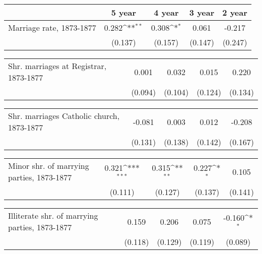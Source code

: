 {
\def\sym#1{\ifmmode^{#1}\else\(^{#1}\)\fi}
\begin{tabular}{l*{4}{c}}
\hline\hline
                    &\multicolumn{1}{c}{5 year}&\multicolumn{1}{c}{4 year}&\multicolumn{1}{c}{3 year}&\multicolumn{1}{c}{2 year}\\
\hline
Marriage rate, 1873-1877&       0.282\sym{**} &       0.308\sym{*}  &       0.061         &      -0.217         \\
                    &     (0.137)         &     (0.157)         &     (0.147)         &     (0.247)         \\
\hline\hline
\end{tabular}
}
{
\def\sym#1{\ifmmode^{#1}\else\(^{#1}\)\fi}
\begin{tabular}{l*{4}{c}}
\hline\hline
\hline
Shr. marriages at Registrar, 1873-1877&       0.001         &       0.032         &       0.015         &       0.220         \\
                    &     (0.094)         &     (0.104)         &     (0.124)         &     (0.134)         \\
\hline\hline
\end{tabular}
}
{
\def\sym#1{\ifmmode^{#1}\else\(^{#1}\)\fi}
\begin{tabular}{l*{4}{c}}
\hline\hline
\hline
Shr. marriages Catholic church, 1873-1877&      -0.081         &       0.003         &       0.012         &      -0.208         \\
                    &     (0.131)         &     (0.138)         &     (0.142)         &     (0.167)         \\
\hline\hline
\end{tabular}
}
{
\def\sym#1{\ifmmode^{#1}\else\(^{#1}\)\fi}
\begin{tabular}{l*{4}{c}}
\hline\hline
\hline
Minor shr. of marrying parties, 1873-1877&       0.321\sym{***}&       0.315\sym{**} &       0.227\sym{*}  &       0.105         \\
                    &     (0.111)         &     (0.127)         &     (0.137)         &     (0.141)         \\
\hline\hline
\end{tabular}
}
{
\def\sym#1{\ifmmode^{#1}\else\(^{#1}\)\fi}
\begin{tabular}{l*{4}{c}}
\hline\hline
\hline
Illiterate shr. of marrying parties, 1873-1877&       0.159         &       0.206         &       0.075         &      -0.160\sym{*}  \\
                    &     (0.118)         &     (0.129)         &     (0.119)         &     (0.089)         \\
\hline\hline
\end{tabular}
}

